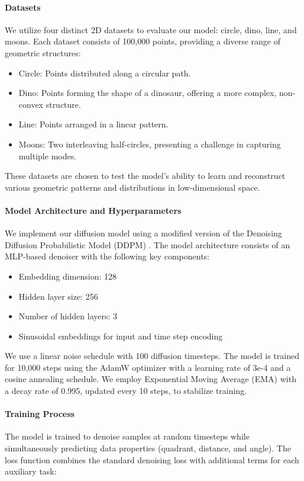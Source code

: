 \documentclass{article} %
\begin{document}
\paragraph{Datasets} We utilize four distinct 2D datasets to evaluate our model: circle, dino, line, and moons. Each dataset consists of 100,000 points, providing a diverse range of geometric structures:
\begin{itemize}
    \item Circle: Points distributed along a circular path.
    \item Dino: Points forming the shape of a dinosaur, offering a more complex, non-convex structure.
    \item Line: Points arranged in a linear pattern.
    \item Moons: Two interleaving half-circles, presenting a challenge in capturing multiple modes.
\end{itemize}
These datasets are chosen to test the model's ability to learn and reconstruct various geometric patterns and distributions in low-dimensional space.

\paragraph{Model Architecture and Hyperparameters} We implement our diffusion model using a modified version of the Denoising Diffusion Probabilistic Model (DDPM) \cite{ddpm}. The model architecture consists of an MLP-based denoiser with the following key components:
\begin{itemize}
    \item Embedding dimension: 128
    \item Hidden layer size: 256
    \item Number of hidden layers: 3
    \item Sinusoidal embeddings for input and time step encoding
\end{itemize}
We use a linear noise schedule with 100 diffusion timesteps. The model is trained for 10,000 steps using the AdamW optimizer with a learning rate of 3e-4 and a cosine annealing schedule. We employ Exponential Moving Average (EMA) with a decay rate of 0.995, updated every 10 steps, to stabilize training.

\paragraph{Training Process} The model is trained to denoise samples at random timesteps while simultaneously predicting data properties (quadrant, distance, and angle). The loss function combines the standard denoising loss with additional terms for each auxiliary task:
\end{document}

